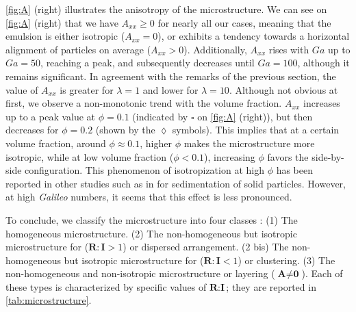 \ref{fig:A} (right) illustrates the anisotropy of the microstructure. We can see on \ref{fig:A} (right) that we have $A_{xx} \ge 0$ for nearly all our cases, meaning that the emulsion is either isotropic ($A_{xx} = 0$), or exhibits a tendency towards a horizontal alignment of particles on average ($A_{xx} >0$). %
Additionally, $A_{xx}$ rises with $Ga$ up to $Ga = 50$, reaching a peak, and subsequently decreases until $Ga = 100$, although it remains significant.
In agreement with the remarks of the previous section, the value of $A_{xx}$ is greater for $\lambda = 1$ and lower for  $\lambda = 10$.
Although not obvious at first, we observe a non-monotonic trend with the volume fraction. $A_{xx}$ increases up to a peak value at $\phi = 0.1$ (indicated by \textcolor{col3}{$\pmb\square$} on \ref{fig:A} (right)), but then decreases for $\phi=0.2$ (shown by the \textcolor{col4}{$\pmb\lozenge$} symbols). %
This implies that at a certain volume fraction, around $\phi \approx 0.1$, higher $\phi$ makes the microstructure more isotropic, while at low volume fraction ($\phi < 0.1$), increasing $\phi$ favors the side-by-side configuration.
This phenomenon of isotropization at high $\phi$ has been reported in other studies such as in \citet{seyed2021sedimentation} for sedimentation of solid particles. 
However, at high \textit{Galileo} numbers, it seems that this effect is less pronounced. 


To conclude, we classify the microstructure into four classes :
(1) The homogeneous microstructure.
(2) The non-homogeneous but isotropic microstructure for ($\textbf{R}:\textbf{I} > 1$) or dispersed arrangement. %
(2 bis) The non-homogeneous but isotropic microstructure for ($\textbf{R}:\textbf{I} < 1$) or clustering. 
(3) The non-homogeneous and non-isotropic microstructure or layering ($\textbf{A}\neq \textbf{0}$). 
Each of these types is characterized by specific values of $\textbf{R}:\textbf{I}$; they are reported in \ref{tab:microstructure}. 

